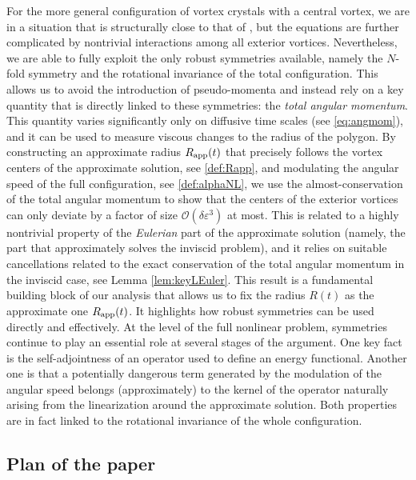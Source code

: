 \documentclass[11pt,reqno,a4paper]{amsart}
\def\eps{\varepsilon}
\newcommand{\cO}{\mathcal{O}}
\newcommand{\1}{\mathbbm{1}}
\theoremstyle{definition}
\theoremstyle{definition}
\numberwithin{equation}{section}
\begin{document}
For the more general configuration of vortex crystals with a central vortex, we are in a situation that is structurally close to that of \cite{zhang2025long}, but the equations are further complicated by nontrivial interactions among all exterior vortices.  Nevertheless, we are able to fully exploit the only robust symmetries available, namely the $N$-fold symmetry and the rotational invariance of the total configuration. This allows us to avoid the introduction of pseudo-momenta and instead rely on a key quantity that is directly linked to these symmetries: the \emph{total angular momentum}. This quantity varies significantly only on diffusive time scales (see \cref{eq:angmom}), and it can be used to measure viscous changes to the radius of the polygon. By constructing an approximate radius $R_{\rm app}(t)$ that precisely follows the vortex centers of the approximate solution, see \cref{def:Rapp}, and modulating the angular speed of the full configuration, see \cref{def:alphaNL}, we use the almost-conservation of the total angular momentum to show that the centers of the exterior vortices can only deviate by a factor of size $\cO(\delta \eps^3)$ at most. This is related to a highly nontrivial property of the \emph{Eulerian} part of the approximate solution (namely, the part that approximately solves the inviscid problem), and it relies on suitable cancellations related to the exact conservation of the total angular momentum in the inviscid case, see Lemma \ref{lem:keyLEuler}. This result is a fundamental building block of our analysis that allows us to fix the radius $R(t)$ as the approximate one $R_{\rm app}(t)$. It highlights how robust symmetries can be used directly and effectively. At the level of the full nonlinear problem, symmetries continue to play an essential role at several stages of the argument. One key fact is the self-adjointness of an operator used to define an energy functional. Another one is that a potentially dangerous term generated by the modulation of the angular speed belongs (approximately) to the kernel of the operator naturally arising from the linearization around the approximate solution. Both properties are in fact linked to the rotational invariance of the whole configuration.



\subsection{Plan of the paper}
\end{document}

